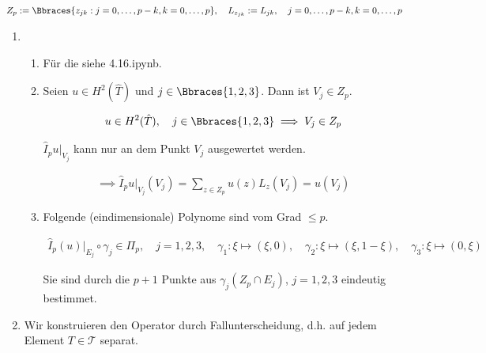 
\begin{solution}

\begin{align*}
  Z_p
  :=
  \Bbraces{z_{jk}: j = 0, \dots, p - k, k = 0, \dots, p},
  \quad
  L_{z_{jk}}
  :=
  L_{jk},
  \quad
  j = 0, \dots, p - k, k = 0, \dots, p
\end{align*}

\begin{enumerate}[label = \textbf{\alph*)}]

  \item

  \begin{enumerate}[label = (\roman*)]

    \item Für die  siehe 4.16.ipynb.

    \item Seien $u \in H^2(\hat T)$ und $j \in \Bbraces{1, 2, 3}$.
    Dann ist $V_j \in Z_p$.

    \begin{align*}
      u \in H^2(\hat T),
      \quad
      j \in \Bbraces{1, 2, 3}
      \implies
      V_j \in Z_p
    \end{align*}

    $\hat I_p u|_{V_j}$ kann nur an dem Punkt $V_j$ ausgewertet werden.

    \begin{align*}
      \implies
      \hat I_p u|_{V_j}(V_j)
      =
      \sum_{z \in Z_p}
      u(z) L_z(V_j)
      =
      u(V_j)
    \end{align*}

    \item Folgende (eindimensionale) Polynome sind vom Grad $\leq p$.

    \begin{align*}
      \hat I_p(u)|_{E_j} \circ \gamma_j \in \Pi_p,
      \quad
      j = 1, 2, 3,
      \quad
      \gamma_1: \xi \mapsto (\xi, 0),
      \quad
      \gamma_2: \xi \mapsto (\xi, 1 - \xi),
      \quad
      \gamma_3: \xi \mapsto (0, \xi)
    \end{align*}

    Sie sind durch die $p + 1$ Punkte aus $\gamma_j(Z_p \cap E_j)$, $j = 1, 2, 3$ eindeutig bestimmet.

  \end{enumerate}

  \item Wir konstruieren den Operator durch Fallunterscheidung, d.h. auf jedem Element $T \in \mathcal{T}$ separat.


\end{enumerate}
\end{solution}
